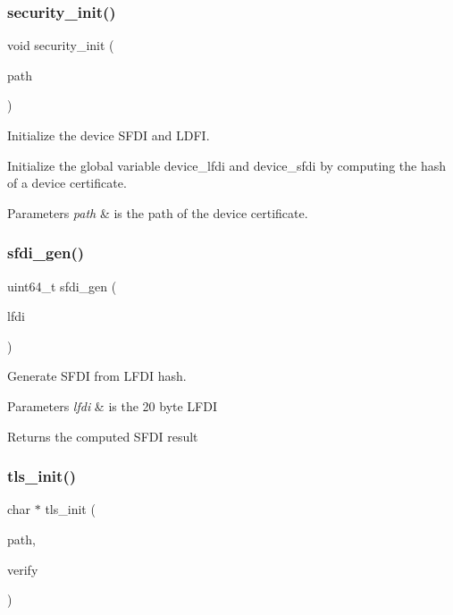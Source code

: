 \subsubsection{\texorpdfstring{security\+\_\+init()}{security\_init()}}
{\footnotesize\ttfamily void security\+\_\+init (\begin{DoxyParamCaption}\item[{const char $\ast$}]{path }\end{DoxyParamCaption})}



Initialize the device S\+F\+DI and L\+D\+FI. 

Initialize the global variable device\+\_\+lfdi and device\+\_\+sfdi by computing the hash of a device certificate. 
\begin{DoxyParams}{Parameters}
{\em path} & is the path of the device certificate. \\
\hline
\end{DoxyParams}
\mbox{\label{group__security_ga0e83013b684ca7c97129148e672a5d83}} 
\subsubsection{\texorpdfstring{sfdi\+\_\+gen()}{sfdi\_gen()}}
{\footnotesize\ttfamily uint64\+\_\+t sfdi\+\_\+gen (\begin{DoxyParamCaption}\item[{uint8\+\_\+t $\ast$}]{lfdi }\end{DoxyParamCaption})}



Generate S\+F\+DI from L\+F\+DI hash. 


\begin{DoxyParams}{Parameters}
{\em lfdi} & is the 20 byte L\+F\+DI \\
\hline
\end{DoxyParams}
\begin{DoxyReturn}{Returns}
the computed S\+F\+DI result 
\end{DoxyReturn}
\mbox{\label{group__security_gabae7ae3a93a3e0e7d8375a3f3a25724d}} 
\subsubsection{\texorpdfstring{tls\+\_\+init()}{tls\_init()}}
{\footnotesize\ttfamily char $\ast$ tls\+\_\+init (\begin{DoxyParamCaption}\item[{const char $\ast$}]{path,  }\item[{Verify\+Func}]{verify }\end{DoxyParamCaption})}



